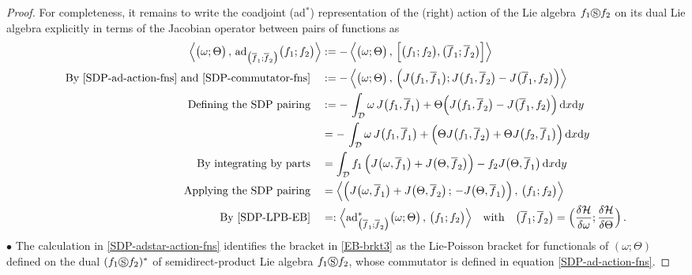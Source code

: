 \documentclass[11pt, oneside]{article}   	%
\numberwithin{equation}{section}
\theoremstyle{plain}
\theoremstyle{definition}
\theoremstyle{remark}
\newcommand{\<}{\langle}
\renewcommand{\>}{\rangle}
\begin{document}
\begin{proof}
For completeness, it remains to write the coadjoint (ad$^*$) representation of the (right) action of the Lie algebra $f_1\circledS f_2$ on its dual Lie algebra explicitly in terms of the Jacobian operator between pairs of functions as 
\begin{align}
\begin{split}
\Big\langle \big(\omega ; \Theta\big) \,,\,
{\mathrm{ad}}_{\big(\overline{f}_1;\overline{f}_2\big)}\big(f_1;f_2\big) 
\Big\rangle
&:= -\,
\Big\langle \big(\omega ; \Theta\big) \,,\,
\Big[ \big(f_1;f_2\big) , \big(\overline{f}_1;\overline{f}_2\big)\Big] 
\Big\rangle
\\
\hbox{By \eqref{SDP-ad-action-fns} and \eqref{SDP-commutator-fns}}\quad
&:= -\,
\Big\langle \big(\omega ; \Theta\big) \,,\,
\Big( J\big( f_1,\overline{f}_1 \big) ; J\big( f_1,\overline{f}_2 \big) 
- J\big( \overline{f}_1,f_2 \big)\Big)
\Big\rangle
\\
\hbox{Defining the SDP pairing}\quad
&:= -\,
\int_{\mathcal D} 
\omega \,J\big( f_1 , \overline{f}_1 \big)
+ \Theta \Big( J\big( f_1,\overline{f}_2 \big) - J\big( \overline{f}_1,f_2 \big) \Big)
\,\mathrm{d}x \mathrm{d}y
\\& = -\,
\int_{\mathcal D} 
\omega \,J\big( f_1,\overline{f}_1 \big)
+  \Big( \Theta J\big( f_1,\overline{f}_2 \big) + \Theta J\big( f_2 , \overline{f}_1 \big) \Big)
\,\mathrm{d}x \mathrm{d}y
\\\hbox{By integrating by parts}\quad
& = 
\int_{\mathcal D} 
f_1\,\Big( J\big( \omega ,\overline{f}_1 \big) +  J\big( \Theta  ,\overline{f}_2 \big)\Big) 
- f_2J\big( \Theta , \overline{f}_1 \big) 
\,\mathrm{d}x \mathrm{d}y
\\
\hbox{Applying the SDP pairing}\quad
&= 
\Big\langle 
\Big( J\big( \omega,\overline{f}_1 \big) + J\big( \Theta ,\overline{f}_2\big)  \,;\, - J\big( \Theta,\overline{f}_1 \big)
\Big)
\,,\,
\big( f_1 ; f_2\big) 
\Big\rangle
\\
\hbox{By \eqref{SDP-LPB-EB}}\quad
&=: 
\Big\langle {\mathrm{ad}}^*_{\big(\overline{f}_1;\overline{f}_2\big)}\big(\omega ; \Theta\big) \,,\,
\big(f_1;f_2\big) 
\Big\rangle
\quad\hbox{with}\quad
\big(\overline{f}_1;\overline{f}_2\big)
=\Big(\frac{\delta \mathcal{H}}{\delta \omega};\frac{\delta \mathcal{H}}{\delta \Theta}\Big)
\,.
\end{split}
\label{SDP-adstar-action-fns}
\end{align}
\noindent
$\bullet$  The calculation in \eqref{SDP-adstar-action-fns} identifies the bracket in \eqref{EB-brkt3} as the Lie-Poisson bracket for functionals of $(\omega ; \Theta)$ defined on the dual $(f_1\circledS f_2)^*$ of semidirect-product Lie algebra $f_1\circledS f_2$, whose commutator is defined in equation  \eqref{SDP-ad-action-fns}. 
\end{proof}
\end{document}

